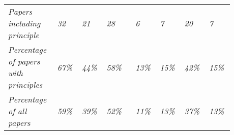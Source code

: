 \begin{landscape}
\begin{ThreePartTable}
\begin{longtable}{P{0.18\linewidth}P{0.1\linewidth}P{0.1\linewidth}P{0.12\linewidth}P{0.08\linewidth}P{0.1\linewidth}P{0.1\linewidth}P{0.1\linewidth}}
    \midrule
        \textit{Papers including principle} & \textit{32} & \textit{21} & \textit{28} & \textit{6} & \textit{7} & \textit{20} & \textit{7} \\ 
        \textit{Percentage of papers with principles} & \textit{67\%} & \textit{44\%} & \textit{58\%} & \textit{13\%} & \textit{15\%} & \textit{42\%} & \textit{15\%} \\ 
        \textit{Percentage of all papers} & \textit{59\%} & \textit{39\%} & \textit{52\%} & \textit{11\%} & \textit{13\%} & \textit{37\%} & \textit{13\%} \\  
\end{longtable}

\end{ThreePartTable}

\end{landscape}

\normalsize
